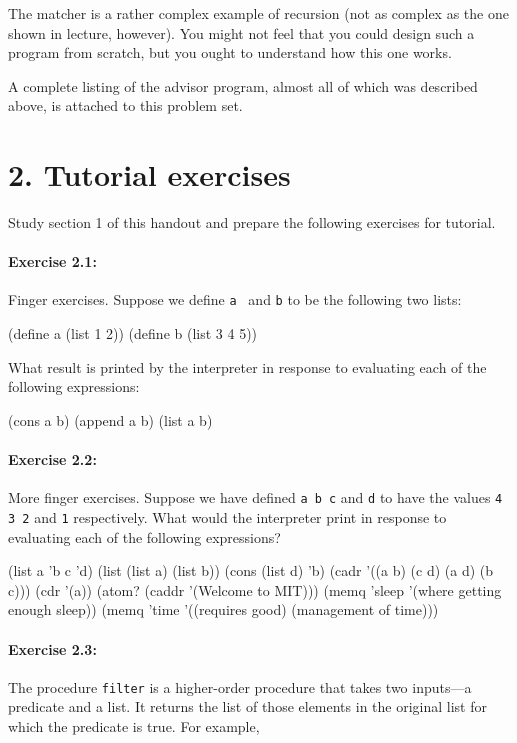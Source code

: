 The matcher is a rather complex example of recursion (not as complex
as the one shown in lecture, however).  You might not feel that you
could design such a program from scratch, but you ought to understand
how this one works.

A complete listing of the advisor program, almost all of which was
described above, is attached to this problem set.


\section{2. Tutorial exercises}

Study section 1 of this handout and prepare the following exercises
for tutorial.

\paragraph{Exercise 2.1:}
Finger exercises.  Suppose we define {\tt a } and
{\tt b} to be the following two lists:

\beginlisp
(define a (list 1 2))
(define b (list 3 4 5))
\endlisp

\noindent
What result is printed by the interpreter in response to evaluating
each of the following expressions:

\beginlisp
(cons a b)
(append a b)
(list a b)
\endlisp

\paragraph{Exercise 2.2:}
More finger exercises.  Suppose we have
defined {\tt a b c} and {\tt d} to have the values {\tt 4 3 2} and
{\tt 1} respectively.  What would the interpreter print in response to
evaluating each of the following expressions?

\beginlisp
(list a 'b c 'd)
(list (list a) (list b))
(cons (list d) 'b)
(cadr '((a b) (c d) (a d) (b c)))
(cdr '(a))
(atom? (caddr '(Welcome to MIT)))
(memq 'sleep '(where getting enough sleep))
(memq 'time '((requires good) (management of time)))
\endlisp


\paragraph{Exercise 2.3:}
The procedure {\tt filter} is a higher-order procedure that takes two
inputs---a predicate and a list.  It returns the list of those
elements in the original list for which the predicate is true.  For
example,


